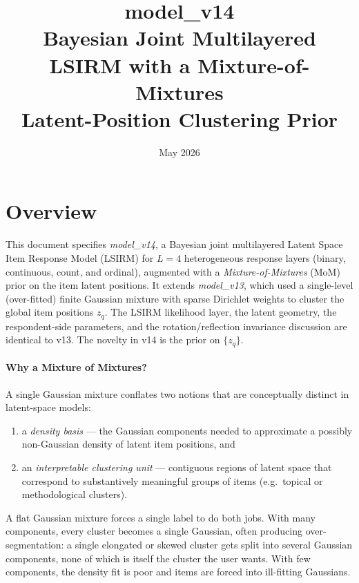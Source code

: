 \documentclass[11pt]{article}
\title{\textbf{model\_v14}\\
Bayesian Joint Multilayered LSIRM with a Mixture-of-Mixtures\\
Latent-Position Clustering Prior}
\author{}
\date{May 2026}
\begin{document}
\maketitle

\section{Overview}
\label{sec:overview}

This document specifies \emph{model\_v14}, a Bayesian joint multilayered Latent
Space Item Response Model (LSIRM) for $L=4$ heterogeneous response layers
(binary, continuous, count, and ordinal), augmented with a
\emph{Mixture-of-Mixtures} (MoM) prior on the item latent positions. It
extends \emph{model\_v13}, which used a single-level (over-fitted)
finite Gaussian mixture with sparse Dirichlet weights to cluster the global
item positions $z_q$. The LSIRM likelihood layer, the latent geometry, the
respondent-side parameters, and the rotation/reflection invariance discussion
are identical to v13. The novelty in v14 is the prior on $\{z_q\}$.

\paragraph{Why a Mixture of Mixtures?}
A single Gaussian mixture conflates two notions that are conceptually
distinct in latent-space models:
\begin{enumerate}[label=(\roman*)]
\item a \emph{density basis} --- the Gaussian components needed to approximate
       a possibly non-Gaussian density of latent item positions, and
\item an \emph{interpretable clustering unit} --- contiguous regions of
       latent space that correspond to substantively meaningful groups of
       items (e.g.\ topical or methodological clusters).
\end{enumerate}
A flat Gaussian mixture forces a single label to do both jobs. With many
components, every cluster becomes a single Gaussian, often producing
over-segmentation: a single elongated or skewed cluster gets split into
several Gaussian components, none of which is itself the cluster the user
wants. With few components, the density fit is poor and items are forced
into ill-fitting Gaussians.
\end{document}

